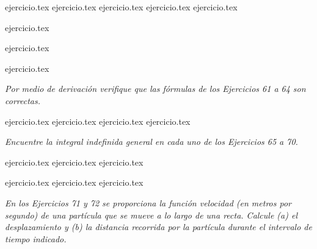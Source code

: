 \begin{enumerate}
    \setcounter{enumi}{52}
    \begin{minipage}{0.45\textwidth}
    {ejercicio.tex}
    {ejercicio.tex}
    {ejercicio.tex}
    {ejercicio.tex}
    {ejercicio.tex}
    \end{minipage}%
    \begin{minipage}{0.45\textwidth}
    \setcounter{enumi}{55}
    {ejercicio.tex}
    \addtocounter{enumi}{1}
    {ejercicio.tex}
    \addtocounter{enumi}{1}
    {ejercicio.tex}
    \end{minipage}
\end{enumerate}

\vspace{1em}
\noindent \textit{Por medio de derivación verifique que las fórmulas de los Ejercicios 61 a 64 son correctas.}

\begin{enumerate}
    \setcounter{enumi}{60}
    {ejercicio.tex}
    {ejercicio.tex}
    {ejercicio.tex}
    {ejercicio.tex}
\end{enumerate}

\vspace{1em}
\noindent \textit{Encuentre la integral indefinida general en cada uno de los Ejercicios 65 a 70.}

\begin{enumerate}
    \setcounter{enumi}{64}
    \begin{minipage}{0.45\textwidth}
    {ejercicio.tex}
    {ejercicio.tex}
    {ejercicio.tex}
    \end{minipage}%
    \begin{minipage}{0.45\textwidth}
    {ejercicio.tex}
    {ejercicio.tex}
    {ejercicio.tex}
    \end{minipage}
\end{enumerate}

\vspace{1em}
\noindent \textit{En los Ejercicios 71 y 72 se proporciona la función velocidad (en metros por segundo) de una partícula que se mueve a lo largo de una recta. Calcule (a) el desplazamiento y (b) la distancia recorrida por la partícula durante el intervalo de tiempo indicado.}

